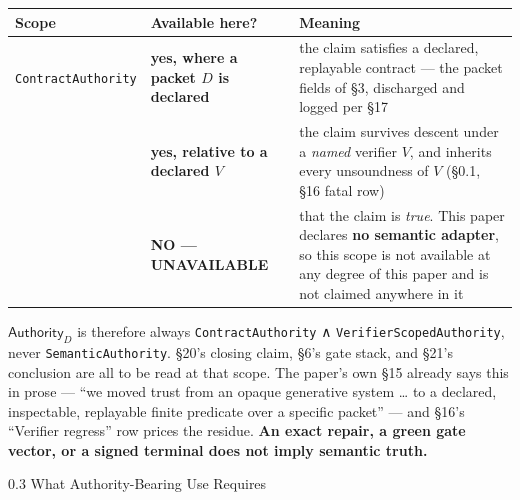 \documentclass[
  10pt,
]{article}
\DeclareRobustCommand{\texttt}[1]{{\paperSymbolFont\nolinkurl{#1}}}
\begin{document}
\begin{longtable}[]{@{}
  >{\raggedright\arraybackslash}p{}
  >{\raggedright\arraybackslash}p{}
  >{\raggedright\arraybackslash}p{}@{}}
\toprule\noalign{}
\begin{minipage}[b]{\linewidth}\raggedright
Scope
\end{minipage} & \begin{minipage}[b]{\linewidth}\raggedright
Available here?
\end{minipage} & \begin{minipage}[b]{\linewidth}\raggedright
Meaning
\end{minipage} \\
\midrule\noalign{}
\endhead
\bottomrule\noalign{}
\endlastfoot
\texttt{ContractAuthority} & \textbf{yes, where a packet \protect\hypertarget{math-E0009-0014}{}{\(D\)} is declared} & the claim satisfies a declared, replayable contract --- the packet fields of §3, discharged and logged per §17 \\
\texttt{VerifierScopedAuthority} & \textbf{yes, relative to a declared \protect\hypertarget{math-E0012-0015}{}{\(V\)}} & the claim survives descent under a \emph{named} verifier \protect\hypertarget{math-E0012-0016}{}{\(V\)}, and inherits every unsoundness of \protect\hypertarget{math-E0012-0017}{}{\(V\)} (§0.1, §16 fatal row) \\
\texttt{SemanticAuthority} & \textbf{NO --- UNAVAILABLE} & that the claim is \emph{true}. This paper declares \textbf{no semantic adapter}, so this scope is not available at any degree of this paper and is not claimed anywhere in it \\
\end{longtable}

\protect\hypertarget{math-E0010-0018}{}{\(\mathsf{Authority}_D\)} is therefore always \texttt{ContractAuthority} ∧ \texttt{VerifierScopedAuthority}, never \texttt{SemanticAuthority}. §20's closing claim, §6's gate stack, and §21's conclusion are all to be read at that scope. The paper's own §15 already says this in prose --- ``we moved trust from an opaque generative system \ldots{} to a declared, inspectable, replayable finite predicate over a specific packet'' --- and §16's ``Verifier regress'' row prices the residue. \textbf{An exact repair, a green gate vector, or a signed terminal does not imply semantic truth.}

0.3 What Authority-Bearing Use Requires
\end{document}
